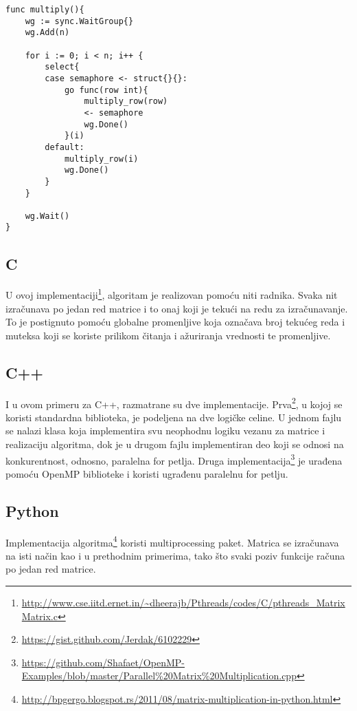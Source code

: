 \documentclass[12pt,oneside]{memoir}
\begin{document}
\begin{center}
\begin{lstlisting}[caption=Go implementacija konkurentne funkcije za množenje matrica,label={lst:matrix},float, backgroundcolor=\color{background}]
func multiply(){
	wg := sync.WaitGroup{}
	wg.Add(n)

	for i := 0; i < n; i++ {
		select{
		case semaphore <- struct{}{}:
			go func(row int){
				multiply_row(row)
				<- semaphore
				wg.Done()
			}(i)
		default:
			multiply_row(i)
			wg.Done()
		}
	}

	wg.Wait()
}
\end{lstlisting}
\end{center}

\subsection{C}
U ovoj implementaciji\footnote{\url{http://www.cse.iitd.ernet.in/~dheerajb/Pthreads/codes/C/pthreads_MatrixMatrix.c}}, algoritam je realizovan pomoću niti radnika. Svaka nit izračunava po jedan red matrice i to onaj koji je tekući na redu za izračunavanje. To je postignuto pomoću globalne promenljive koja označava broj tekućeg reda i muteksa koji se koriste prilikom čitanja i ažuriranja vrednosti te promenljive.

\subsection{C++}
I u ovom primeru za C++, razmatrane su dve implementacije. Prva\footnote{\url{https://gist.github.com/Jerdak/6102229}}, u kojoj se koristi standardna biblioteka, je podeljena na dve logičke celine. U jednom fajlu se nalazi klasa koja implementira svu neophodnu logiku vezanu za matrice i realizaciju algoritma, dok je u drugom fajlu implementiran deo koji se odnosi na konkurentnost, odnosno, paralelna for petlja. Druga implementacija\footnote{\url{https://github.com/Shafaet/OpenMP-Examples/blob/master/Parallel\%20Matrix\%20Multiplication.cpp}} je urađena pomoću OpenMP biblioteke i koristi ugrađenu paralelnu for petlju. 

\subsection{Python}
Implementacija algoritma\footnote{\url{http://bpgergo.blogspot.rs/2011/08/matrix-multiplication-in-python.html}} koristi multiprocessing paket. Matrica se izračunava na isti način kao i u prethodnim primerima, tako što svaki poziv funkcije računa po jedan red matrice.  
\end{document}
